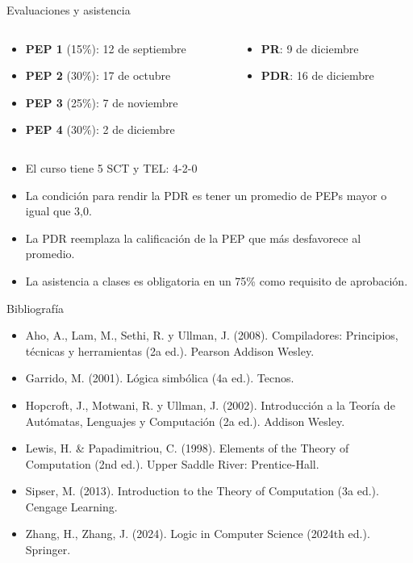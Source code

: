 \documentclass{beamer}
\begin{document}
\begin{frame}{Evaluaciones y asistencia}
  \begin{columns}
    \begin{column}{0.6\textwidth}
      \begin{itemize}
        \item \textbf{PEP 1} (15\%): 12 de septiembre
        \item \textbf{PEP 2} (30\%): 17 de octubre
        \item \textbf{PEP 3} (25\%): 7 de noviembre
        \item \textbf{PEP 4} (30\%): 2 de diciembre
      \end{itemize}
    \end{column}

    \begin{column}{0.4\textwidth}
      \begin{itemize}
        \item \textbf{PR}: 9 de diciembre
        \item \textbf{PDR}: 16 de diciembre
      \end{itemize}
    \end{column}
  \end{columns}

  \begin{itemize}
    \vspace{0.3cm}
    \item El curso tiene 5 SCT y TEL: 4-2-0
    \item La condición para rendir la PDR es tener un promedio de PEPs mayor o
          igual que 3,0.
    \item La PDR reemplaza la calificación de la PEP que más desfavorece al
          promedio.
    \item La asistencia a clases es obligatoria en un 75\% como requisito de
          aprobación.
  \end{itemize}
\end{frame}


\begin{frame}{Bibliografía}
  \begin{itemize}
    \item Aho, A., Lam, M., Sethi, R. y Ullman, J. (2008). Compiladores:
          Principios, técnicas y herramientas (2a ed.). Pearson Addison Wesley.
    \item Garrido, M. (2001). Lógica simbólica (4a ed.). Tecnos.
    \item Hopcroft, J., Motwani, R. y Ullman, J. (2002). Introducción a la
          Teoría de Autómatas, Lenguajes y Computación (2a ed.). Addison Wesley.
    \item Lewis, H. \& Papadimitriou, C. (1998). Elements of the Theory of
          Computation (2nd ed.). Upper Saddle River: Prentice-Hall.
    \item Sipser, M. (2013). Introduction to the Theory of Computation (3a ed.).
          Cengage Learning.
    \item Zhang, H., Zhang, J. (2024). Logic in Computer Science (2024th ed.).
          Springer.
  \end{itemize}
\end{frame}
\end{document}
